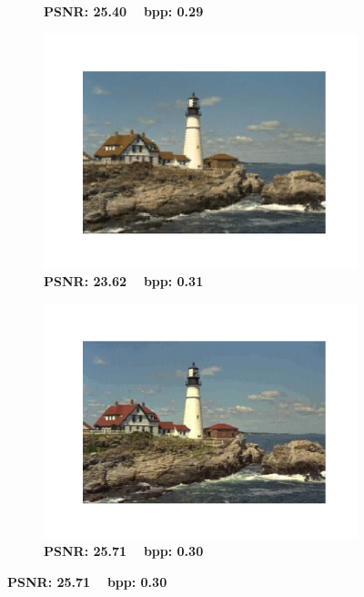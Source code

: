 \begin{figure}[t]
\begin{subfigure}{.23\textwidth}
        \vspace{-20pt}
        \caption*{\tiny \textbf{PSNR: 25.40 ~ bpp: 0.29}}
	\end{subfigure}
    \begin{subfigure}{.23\textwidth}
		\centering
		\includegraphics[trim=1.7cm 1.5cm 1.7cm 1.7cm, clip, width=1\textwidth]{figures/kodim21_SVD_bpp_0.315.pdf}
        \vspace{-20pt}
        \caption*{\tiny \textbf{PSNR: 23.62 ~ bpp: 0.31}}
	\end{subfigure}
    \begin{subfigure}{.23\textwidth}
		\centering
		\includegraphics[trim=1.7cm 1.5cm 1.7cm 1.7cm, clip, width=1\textwidth]{figures/kodim21_IMF_bpp_0.305.pdf}
        \vspace{-20pt}
        \caption*{\tiny \textbf{PSNR: 25.71 ~ bpp: 0.30}}
	\end{subfigure}



\end{figure}
